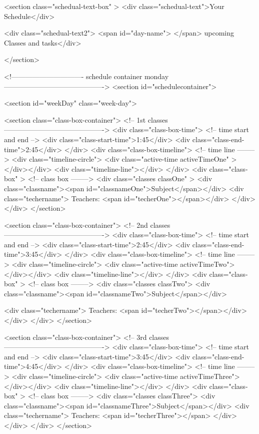 <section class="schedual-text-box" >
  <div class="schedual-text">Your Schedule</div>

  <div class="schedual-text2">   <span id="day-name"> </span> upcoming Classes and tasks</div>

</section>

<!------------------------------- schedule container monday------------------------------------------->
<section id="schedulecontainer">

  <section id="weekDay" class="week-day">

  <section class="class-box-container">      <!-- 1st classes------------------------------------------->
   <div class="class-box-time">            <!-- time start and end -->
   <div class="class-start-time">1:45</div>
   <div class="class-end-time">2:45</div>
   </div>
   <div class="class-box-timeline">       <!-- time line -------->
   <div class="timeline-circle"> <div class="active-time activeTimeOne" ></div></div>
   <div class="timeline-line"></div>
   </div>
   <div class="class-box" >                <!-- class box -------->
    <div class="classes classOne" >
   <div class="classname"><span id="classnameOne">Subject</span></div>
   <div class="techername"> Teachers: <span id="techerOne"></span></div>
   </div>
   </div> 
</section> 

<section class="class-box-container">    <!-- 2nd classes-------------------------------------------> 
   <div class="class-box-time">          <!-- time start and end -->
   <div class="class-start-time">2:45</div>
   <div class="class-end-time">3:45</div>
   </div>
   <div class="class-box-timeline">      <!-- time line -------->
   <div class="timeline-circle"> <div class="active-time activeTimeTwo"></div></div>
   <div class="timeline-line"></div>
   </div>
   <div class="class-box" >              <!-- class box -------->
   <div class="classes classTwo">
   <div class="classname"><span id="classnameTwo">Subject</span></div>

   <div class="techername"> Teachers: <span id="techerTwo"></span></div>
  </div>
  </div> 
</section> 

<section class="class-box-container">    <!-- 3rd classes-------------------------------------------> 
  <div class="class-box-time">          <!-- time start and end -->
  <div class="class-start-time">3:45</div>
  <div class="class-end-time">4:45</div>
  </div>
  <div class="class-box-timeline">      <!-- time line -------->
  <div class="timeline-circle"> <div class="active-time activeTimeThree"></div></div>
  <div class="timeline-line"></div>
  </div>
  <div class="class-box" >              <!-- class box -------->
  <div class="classes classThree">
  <div class="classname"><span id="classnameThree">Subject</span></div>
  <div class="techername"> Teachers: <span id="techerThree"></span> </div>
 </div>
 </div> 
</section> 


